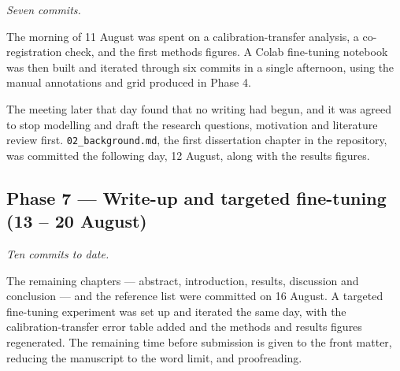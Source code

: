 \emph{Seven commits.}

The morning of 11 August was spent on a calibration-transfer analysis, a co-registration check, and the first methods figures. A Colab fine-tuning notebook was then built and iterated through six commits in a single afternoon, using the manual annotations and grid produced in Phase 4.

The meeting later that day found that no writing had begun, and it was agreed to stop modelling and draft the research questions, motivation and literature review first. \texttt{02\_\allowbreak{}background.\allowbreak{}md}, the first dissertation chapter in the repository, was committed the following day, 12 August, along with the results figures.

\hypertarget{phase-7-write-up-and-targeted-fine-tuning-13-20-august}{%
\subsection*{Phase 7 --- Write-up and targeted fine-tuning (13 -- 20 August)}\label{phase-7-write-up-and-targeted-fine-tuning-13-20-august}}

\emph{Ten commits to date.}

The remaining chapters --- abstract, introduction, results, discussion and conclusion --- and the reference list were committed on 16 August. A targeted fine-tuning experiment was set up and iterated the same day, with the calibration-transfer error table added and the methods and results figures regenerated. The remaining time before submission is given to the front matter, reducing the manuscript to the word limit, and proofreading.

